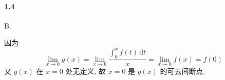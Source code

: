 \paragraph*{1.4}B. 

因为
\[
	\lim_{x\to 0}g(x)=\lim_{x\to 0}\dfrac{\int_{0}^xf(t)\,\mathrm{d}t}{x}=\lim_{x\to 0}f(x)=f(0)
\]
又 $g(x)$ 在 $x=0$ 处无定义, 故 $x=0$ 是 $g(x)$ 的可去间断点.